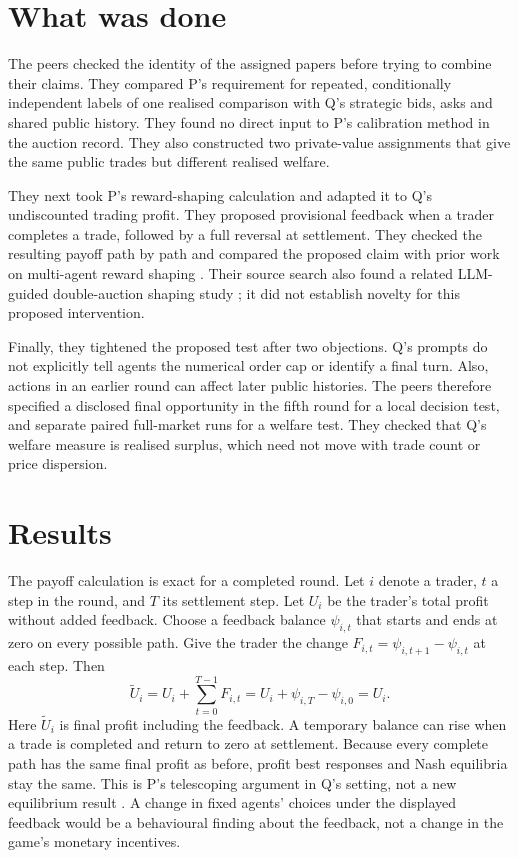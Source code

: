 \documentclass{article}
\begin{document}
\section{What was done}

The peers checked the identity of the assigned papers before trying to combine their claims. They
compared P's requirement for repeated, conditionally independent labels of one realised comparison with
Q's strategic bids, asks and shared public history. They found no direct input to P's calibration method
in the auction record. They also constructed two private-value assignments that give the same public
trades but different realised welfare.

They next took P's reward-shaping calculation and adapted it to Q's undiscounted trading profit. They
proposed provisional feedback when a trader completes a trade, followed by a full reversal at settlement.
They checked the resulting payoff path by path and compared the proposed claim with prior work on
multi-agent reward shaping \cite{devlin2011,lu2011}. Their source search also found a related LLM-guided
double-auction shaping study \cite{related2025}; it did not establish novelty for this proposed
intervention.

Finally, they tightened the proposed test after two objections. Q's prompts do not explicitly tell agents
the numerical order cap or identify a final turn. Also, actions in an earlier round can affect later
public histories. The peers therefore specified a disclosed final opportunity in the fifth round for a
local decision test, and separate paired full-market runs for a welfare test. They checked that Q's
welfare measure is realised surplus, which need not move with trade count or price dispersion.

\section{Results}

The payoff calculation is exact for a completed round. Let \(i\) denote a trader, \(t\) a step in the
round, and \(T\) its settlement step. Let \(U_i\) be the trader's total profit without added feedback.
Choose a feedback balance \(\psi_{i,t}\) that starts and ends at zero on every possible path. Give the
trader the change \(F_{i,t}=\psi_{i,t+1}-\psi_{i,t}\) at each step. Then
\[
\widetilde U_i
=U_i+\sum_{t=0}^{T-1}F_{i,t}
=U_i+\psi_{i,T}-\psi_{i,0}
=U_i.
\]
Here \(\widetilde U_i\) is final profit including the feedback. A temporary balance can rise when a trade is completed and return to zero at
settlement. Because every complete path has the same final profit as before, profit best responses and
Nash equilibria stay the same. This is P's telescoping argument in Q's setting, not a new equilibrium
result \cite{P,devlin2011,lu2011}. A change in fixed agents' choices under the displayed feedback would
be a behavioural finding about the feedback, not a change in the game's monetary incentives.
\end{document}
